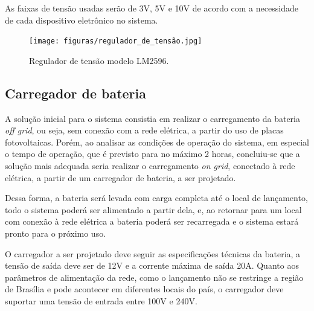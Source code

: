 As faixas de tensão usadas serão de 3V, 5V e 10V de acordo com a necessidade de cada dispositivo eletrônico no sistema.

\begin{figure}[!h]
	\centering
	\label{regulador_tensão}
		\texttt{[image: figuras/regulador\_de\_tensão.jpg]}
	\caption{Regulador de tensão modelo LM2596.}
	\label{fig:regulador tensao}
\end{figure}

\subsection{Carregador de bateria}

A solução inicial para o sistema consistia em realizar o carregamento da bateria \textit{off grid}, ou seja, sem conexão com a rede elétrica, a partir do uso de placas fotovoltaicas. Porém, ao analisar as condições de operação do sistema, em especial o tempo de operação, que é previsto para no máximo 2 horas, concluiu-se que a solução mais adequada seria realizar o carregamento \textit{on grid}, conectado à rede elétrica, a partir de um carregador de bateria, a ser projetado.

Dessa forma, a bateria será levada com carga completa até o local de lançamento, todo o sistema poderá ser alimentado a partir dela, e, ao retornar para um local com conexão à rede elétrica a bateria poderá ser recarregada e o sistema estará pronto para o próximo uso.

O carregador a ser projetado deve seguir as especificações técnicas da bateria, a tensão de saída deve ser de 12V e a corrente máxima de saída 20A. Quanto aos parâmetros de alimentação da rede, como o lançamento não se restringe a região de Brasília e pode acontecer em diferentes locais do país, o carregador deve suportar uma tensão de entrada entre 100V e 240V.


